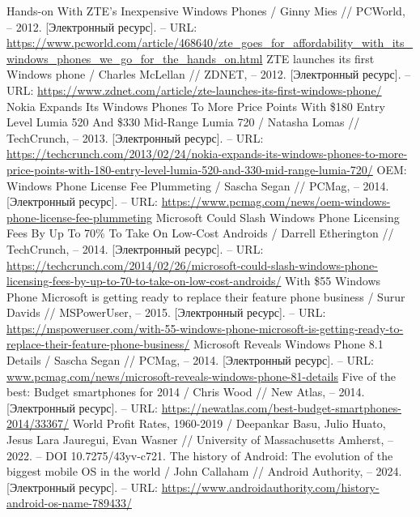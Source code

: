 \documentclass{article}
\begin{document}
\begin{thebibliography}{2}
 Hands-on With ZTE’s Inexpensive Windows Phones / Ginny Mies // PCWorld, – 2012. [Электронный ресурс]. – URL: \url{https://www.pcworld.com/article/468640/zte\_goes\_for\_affordability\_with\_its\_windows\_phones\_we\_go\_for\_the\_hands\_on.html}
 ZTE launches its first Windows phone / Charles McLellan // ZDNET, – 2012. [Электронный ресурс]. – URL: \url{https://www.zdnet.com/article/zte-launches-its-first-windows-phone/}
 Nokia Expands Its Windows Phones To More Price Points With \$180 Entry Level Lumia 520 And \$330 Mid-Range Lumia 720 / Natasha Lomas // TechCrunch, – 2013. [Электронный ресурс]. – URL: \url{https://techcrunch.com/2013/02/24/nokia-expands-its-windows-phones-to-more-price-points-with-180-entry-level-lumia-520-and-330-mid-range-lumia-720/}
 OEM: Windows Phone License Fee Plummeting / Sascha Segan // PCMag, – 2014. [Электронный ресурс]. – URL: \url{https://www.pcmag.com/news/oem-windows-phone-license-fee-plummeting}
 Microsoft Could Slash Windows Phone Licensing Fees By Up To 70\% To Take On Low-Cost Androids / Darrell Etherington // TechCrunch, – 2014. [Электронный ресурс]. – URL: \url{https://techcrunch.com/2014/02/26/microsoft-could-slash-windows-phone-licensing-fees-by-up-to-70-to-take-on-low-cost-androids/}
 With \$55 Windows Phone Microsoft is getting ready to replace their feature phone business / Surur Davids // MSPowerUser, – 2015. [Электронный ресурс]. – URL: \url{https://mspoweruser.com/with-55-windows-phone-microsoft-is-getting-ready-to-replace-their-feature-phone-business/}
 Microsoft Reveals Windows Phone 8.1 Details / Sascha Segan // PCMag, – 2014. [Электронный ресурс]. – URL: \url{www.pcmag.com/news/microsoft-reveals-windows-phone-81-details}
 Five of the best: Budget smartphones for 2014 / Chris Wood // New Atlas, – 2014. [Электронный ресурс]. – URL: \url{https://newatlas.com/best-budget-smartphones-2014/33367/}
 World Profit Rates, 1960-2019 / Deepankar Basu, Julio Huato, Jesus Lara Jauregui, Evan Wasner // University of Massachusetts Amherst, – 2022. – DOI 10.7275/43yv-c721.
 The history of Android: The evolution of the biggest mobile OS in the world / John Callaham // Android Authority, – 2024. [Электронный ресурс]. – URL: \url{https://www.androidauthority.com/history-android-os-name-789433/}

\end{thebibliography}
\end{document}
